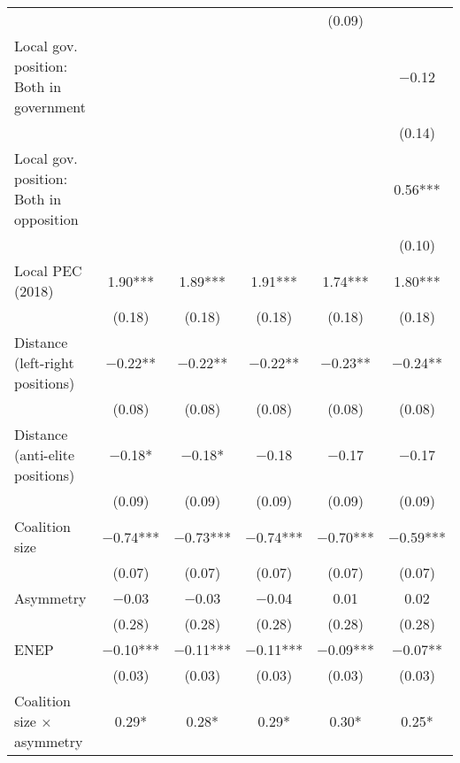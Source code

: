 \begin{tabular}[t]{lccccc}
&                 &                 &                 & (\num{0.09})   &                 \\
Local gov. position: Both in government &                 &                 &                 &                 & \num{-0.12}    \\
&                 &                 &                 &                 & (\num{0.14})   \\
Local gov. position: Both in opposition &                 &                 &                 &                 & \num{0.56}***  \\
&                 &                 &                 &                 & (\num{0.10})   \\
Local PEC (2018)                        & \num{1.90}***  & \num{1.89}***  & \num{1.91}***  & \num{1.74}***  & \num{1.80}***  \\
& (\num{0.18})   & (\num{0.18})   & (\num{0.18})   & (\num{0.18})   & (\num{0.18})   \\
Distance (left-right positions)         & \num{-0.22}**  & \num{-0.22}**  & \num{-0.22}**  & \num{-0.23}**  & \num{-0.24}**  \\
& (\num{0.08})   & (\num{0.08})   & (\num{0.08})   & (\num{0.08})   & (\num{0.08})   \\
Distance (anti-elite positions)         & \num{-0.18}*   & \num{-0.18}*   & \num{-0.18}   & \num{-0.17}   & \num{-0.17}   \\
& (\num{0.09})   & (\num{0.09})   & (\num{0.09})   & (\num{0.09})   & (\num{0.09})   \\
Coalition size                          & \num{-0.74}*** & \num{-0.73}*** & \num{-0.74}*** & \num{-0.70}*** & \num{-0.59}*** \\
& (\num{0.07})   & (\num{0.07})   & (\num{0.07})   & (\num{0.07})   & (\num{0.07})   \\
Asymmetry                               & \num{-0.03}    & \num{-0.03}    & \num{-0.04}    & \num{0.01}     & \num{0.02}     \\
& (\num{0.28})   & (\num{0.28})   & (\num{0.28})   & (\num{0.28})   & (\num{0.28})   \\
ENEP                                    & \num{-0.10}*** & \num{-0.11}*** & \num{-0.11}*** & \num{-0.09}*** & \num{-0.07}**  \\
& (\num{0.03})   & (\num{0.03})   & (\num{0.03})   & (\num{0.03})   & (\num{0.03})   \\
Coalition size × asymmetry              & \num{0.29}*    & \num{0.28}*    & \num{0.29}*    & \num{0.30}*    & \num{0.25}*    \\

\end{tabular}
